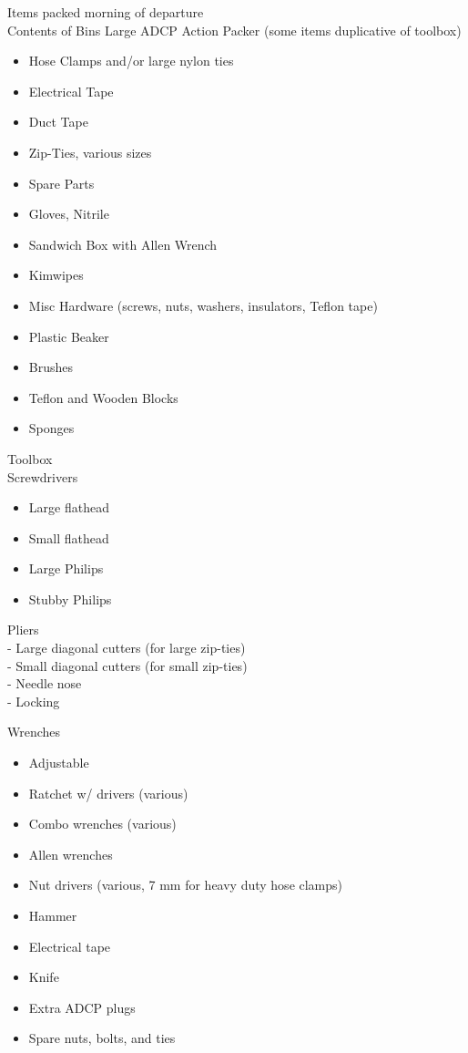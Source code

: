 \documentclass[
]{book}
\providecommand{\tightlist}{%
  \setlength{\itemsep}{0pt}\setlength{\parskip}{0pt}}
\begin{document}
Items packed morning of departure\\
Contents of Bins
Large ADCP Action Packer
(some items duplicative of toolbox)

\begin{itemize}
\tightlist
\item
  Hose Clamps and/or large nylon ties
\item
  Electrical Tape
\item
  Duct Tape
\item
  Zip-Ties, various sizes
\item
  Spare Parts
\item
  Gloves, Nitrile
\item
  Sandwich Box with Allen Wrench
\item
  Kimwipes
\item
  Misc Hardware (screws, nuts, washers, insulators, Teflon tape)
\item
  Plastic Beaker
\item
  Brushes
\item
  Teflon and Wooden Blocks
\item
  Sponges
\end{itemize}

Toolbox\\
Screwdrivers

\begin{itemize}
\tightlist
\item
  Large flathead
\item
  Small flathead
\item
  Large Philips
\item
  Stubby Philips
\end{itemize}

Pliers\\
- Large diagonal cutters (for large zip-ties)\\
- Small diagonal cutters (for small zip-ties)\\
- Needle nose\\
- Locking

Wrenches

\begin{itemize}
\tightlist
\item
  Adjustable\\
\item
  Ratchet w/ drivers (various)\\
\item
  Combo wrenches (various)\\
\item
  Allen wrenches\\
\item
  Nut drivers (various, 7 mm for heavy duty hose clamps)\\
\item
  Hammer\\
\item
  Electrical tape\\
\item
  Knife\\
\item
  Extra ADCP plugs\\
\item
  Spare nuts, bolts, and ties
\end{itemize}
\end{document}
